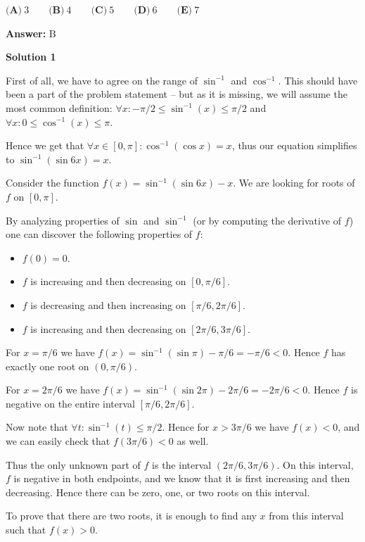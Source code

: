 \begin{enumerate}
 $\textbf{(A)}\ 3\qquad \textbf{(B)}\ 4\qquad \textbf{(C)}\ 5\qquad \textbf{(D)}\ 6\qquad \textbf{(E)}\ 7$

 \textbf{Answer: }B



\textbf{Solution 1}

First of all, we have to agree on the range of $\sin^{-1}$ and $\cos^{-1}$. This should have been a part of the problem statement -- but as it is missing, we will assume the most common definition: $\forall x: -\pi/2 \leq \sin^{-1}(x) \leq \pi/2$ and $\forall x: 0\leq \cos^{-1}(x) \leq \pi$.

 Hence we get that $\forall x\in[0,\pi]: \cos^{ - 1}(\cos x) = x$, thus our equation simplifies to $\sin^{ - 1}(\sin 6x) = x$.

 Consider the function $f(x) = \sin^{ - 1}(\sin 6x)  - x$. We are looking for roots of $f$ on $[0,\pi]$.

 By analyzing properties of $\sin$ and $\sin^{-1}$ (or by computing the derivative of $f$) one can discover the following properties of $f$:

 
            \begin{itemize}
        \item $f(0)=0$.
        \item $f$ is increasing and then decreasing on $[0,\pi/6]$.
        \item $f$ is decreasing and then increasing on $[\pi/6,2\pi/6]$.
        \item $f$ is increasing and then decreasing on $[2\pi/6,3\pi/6]$.
            \end{itemize}
            For $x=\pi/6$ we have $f(x) = \sin^{-1} (\sin \pi) - \pi/6 = -\pi/6 < 0$. Hence $f$ has exactly one root on $(0,\pi/6)$.

 For $x=2\pi/6$ we have $f(x) = \sin^{-1} (\sin 2\pi) - 2\pi/6 = -2\pi/6 < 0$. Hence $f$ is negative on the entire interval $[\pi/6,2\pi/6]$.

 Now note that $\forall t: \sin^{-1}(t) \leq \pi/2$. Hence for $x > 3\pi/6$ we have $f(x) < 0$, and we can easily check that $f(3\pi/6)<0$ as well.

 Thus the only unknown part of $f$ is the interval $(2\pi/6,3\pi/6)$. On this interval, $f$ is negative in both endpoints, and we know that it is first increasing and then decreasing. Hence there can be zero, one, or two roots on this interval.

 To prove that there are two roots, it is enough to find any $x$ from this interval such that $f(x)>0$.


\end{enumerate}
